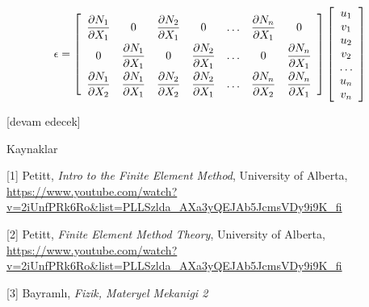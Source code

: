\documentclass[12pt,fleqn]{article}\usepackage{../../common}
\begin{document}
$$
\renewcommand*{\arraystretch}{2.0}
\epsilon =
\left[\begin{array}{ccccccc}
\dfrac{\partial N_1}{\partial X_1} & 0 &
\dfrac{\partial N_2}{\partial X_1} & 0 & \dots &
\dfrac{\partial N_n}{\partial X_1} & 0  \\
0 & \dfrac{\partial N_1}{\partial X_1} &
0 & \dfrac{\partial N_2}{\partial X_1} & \dots &
0 & \dfrac{\partial N_n}{\partial X_1}  \\
\dfrac{\partial N_1}{\partial X_2} & \dfrac{\partial N_1}{\partial X_1} & 
\dfrac{\partial N_2}{\partial X_2} & \dfrac{\partial N_2}{\partial X_1} & \dots &
\dfrac{\partial N_n}{\partial X_2} & \dfrac{\partial N_n}{\partial X_1} 
\end{array}\right]
\renewcommand*{\arraystretch}{1.0}
\left[\begin{array}{c}
u_1 \\ v_1 \\ u_2 \\ v_2 \\ \dots \\ u_n \\ v_n
\end{array}\right]
$$













[devam edecek]

Kaynaklar

[1] Petitt, {\em Intro to the Finite Element Method}, University of Alberta,
    \url{https://www.youtube.com/watch?v=2iUnfPRk6Ro&list=PLLSzlda_AXa3yQEJAb5JcmsVDy9i9K_fi}

[2] Petitt, {\em Finite Element Method Theory}, University of Alberta,
    \url{https://www.youtube.com/watch?v=2iUnfPRk6Ro&list=PLLSzlda_AXa3yQEJAb5JcmsVDy9i9K_fi}

[3] Bayramlı, {\em Fizik, Materyel Mekanigi 2}
    
\end{document}
